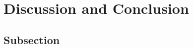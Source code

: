 \documentclass[]{article}
\begin{document}
\clearpage
\section{Discussion and Conclusion} \label{sec:conclusion}



\subsection{Subsection} \label{sec:subsection}



\end{document}
